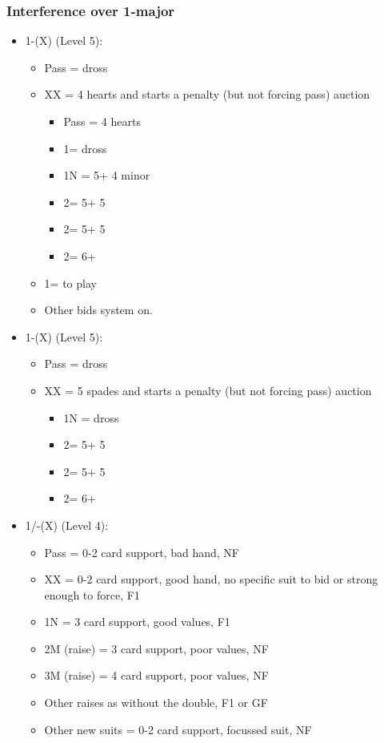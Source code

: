 \documentclass[a4paper,14pt]{extarticle}
\begin{document}
\subsubsection{Interference over 1-major}
\label{sec:intf:1M}

{\it
\begin{itemize}
\item 1\hearts-(X) (Level 5):
	\begin{itemize}
	\item Pass = dross
	\item XX = 4 hearts and starts a penalty (but not forcing pass) auction
		\begin{itemize}
		\item Pass = 4 hearts
		\item 1\spades = dross
		\item 1N = 5\spades + 4 minor
		\item 2\clubs = 5\spades + 5\clubs
		\item 2\diamonds = 5\spades + 5\diamonds
		\item 2\spades = 6+\spades
		\end{itemize}
	\item 1\spades = to play
	\item Other bids system on.
	\end{itemize}
\item 1\spades-(X) (Level 5):
	\begin{itemize}
	\item Pass = dross
	\item XX = 5 spades and starts a penalty (but not forcing pass) auction
		\begin{itemize}
		\item 1N = dross
		\item 2\clubs = 5\hearts + 5\clubs
		\item 2\diamonds = 5\hearts + 5\diamonds
		\item 2\hearts = 6+\hearts
		\end{itemize}
	\end{itemize}
\end{itemize}
}

{\color{CadetBlue}
\begin{itemize}
\item 1\hearts/\spades-(X) (Level 4):
	\begin{itemize}
	\item Pass = 0-2 card support, bad hand, NF
	\item XX = 0-2 card support, good hand, no specific suit to bid or strong enough to force, F1
	\item 1N = 3 card support, good values, F1
	\item 2M (raise) = 3 card support, poor values, NF
	\item 3M (raise) = 4 card support, poor values, NF
	\item Other raises as without the double, F1 or GF
	\item Other new suits = 0-2 card support, focussed suit, NF
	\end{itemize}
\end{itemize}
}
\end{document}
